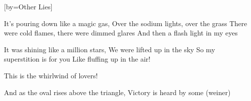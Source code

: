 [by={Other Lies}]

  \chordsoff
  \beginverse
  It’s pouring down like a magic gas,
  Over the sodium lights, over the grass
  There were cold flames, there were dimmed glares
  And then a flash light in my eyes
  \endverse

  \beginverse
  It was shining like a million stars,
  We were lifted up in the sky
  So my superstition is for you
  Like fluffing up in the air!
  \endverse

  \beginchorus
  This is the whirlwind of lovers!
  \endchorus


  \beginchorus
  And as the oval rises above the triangle,
  Victory is heard by some (weiner)
  \endchorus
  
\endsong
